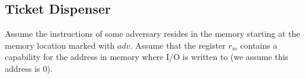 \documentclass{article}
\newcommand{\var}[1]{\mathit{#1}}
\newcommand{\codelabel}[1]{\mathit{#1}}
\begin{document}
\subsection{Ticket Dispenser}
\label{sec:tick-disp}
\newcommand{\size}{\var{size}}
\newcommand{\rio}{r_{io}}
\newcommand{\mrlen}{5cm}
\newcommand{\bracket}[1]{\multirow{#1}{*}{\ensuremath{
 \left . \vphantom{\begin{array}{l}
 \ifthenelse{\equal{#1}{1}}{3\\}{
    \ifthenelse{\equal{#1}{2}}{3\\3\\}{
    \ifthenelse{\equal{#1}{3}}{3\\3\\3\\}{
    \ifthenelse{\equal{#1}{4}}{3\\3\\3\\3\\}{
    \ifthenelse{\equal{#1}{5}}{3\\3\\3\\3\\3\\}{
    \ifthenelse{\equal{#1}{6}}{3\\3\\3\\3\\3\\3\\}{
      3\\3\\3\\3\\3\\3\\3\\ %
  }}}}}}
  \end{array}} \right \}}}
}
\newcommand{\annotate}[2]{\multirow{#1}{\mrlen}{\scriptsize #2}}
Assume the instructions of some adversary resides in the memory starting at the memory location marked with $\codelabel{adv}$. Assume that the register $\rio$ contains a capability for the address in memory where I/O is written to (we assume this address is 0).
\end{document}
